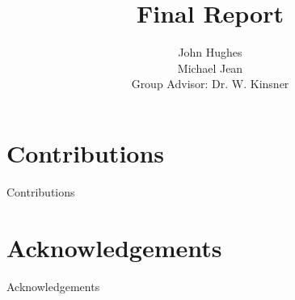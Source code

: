 \documentclass[english]{scrreprt}
\begin{document}


\subject{Design and implementation of a distributed automotive sensor/actuator network}
\title{Final Report}

\author{John Hughes\\ Michael Jean\\ Group Advisor: Dr. W. Kinsner}

\maketitle


\begin{abstract}

\end{abstract}

\chapter*{Contributions}
Contributions

\chapter*{Acknowledgements}
Acknowledgements

\renewcommand{\contentsname}{Table of Contents}
\tableofcontents{}

\newpage
{} \label{listoffig}
\listoffigures

\newpage
{} \label{listoftab}
\listoftables

\newpage
{} \label{nomenclature}
\printnomenclature{}

\newpage











\end{document}
